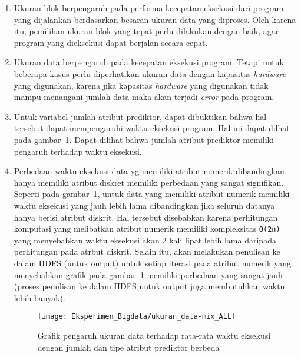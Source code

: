 \begin{enumerate}[label=(\alph*)]
	\item Ukuran blok berpengaruh pada performa kecepatan eksekusi dari program yang dijalankan berdasarkan besaran ukuran data yang diproses. Oleh karena itu, pemilihan ukuran blok yang tepat perlu dilakukan dengan baik, agar program yang dieksekusi dapat berjalan secara cepat.
	\item Ukuran data berpengaruh pada kecepatan eksekusi program. Tetapi untuk beberapa kasus perlu diperhatikan ukuran data dengan kapasitas \textit{hardware} yang digunakan, karena jika kapasitas \textit{hardware} yang digunakan tidak mampu menangani jumlah data maka akan terjadi \textit{error} pada program.
	\item Untuk variabel jumlah atribut prediktor, dapat dibuktikan bahwa hal tersebut dapat mempengaruhi waktu eksekusi program. Hal ini dapat dilhat pada gambar~\ref{fig:Grafik pengaruh ukuran data terhadap rata-rata waktu eksekusi mix}. Dapat dilihat bahwa jumlah atribut prediktor memiliki pengaruh terhadap waktu eksekusi.	
	\item Perbedaan waktu eksekusi data yg memiliki atribut numerik dibandingkan hanya memiliki atribut diskret memiliki perbedaan yang sangat signifikan. Seperti pada gambar~\ref{fig:Grafik pengaruh ukuran data terhadap rata-rata waktu eksekusi mix}, untuk data yang memiliki atribut numerik memiliki waktu eksekusi yang jauh lebih lama dibandingkan jika seluruh datanya hanya berisi atribut diskrit. Hal tersebut disebabkan karena perhitungan komputasi yang melibatkan atribut numerik memiliki kompleksitas \verb|O(2n)| yang menyebabkan waktu eksekusi akan 2 kali lipat lebih lama daripada perhitungan pada atrbut diskrit. Selain itu, akan melakukan penulisan ke dalam HDFS (untuk output) untuk setiap iterasi pada atribut numerik yang menyebabkan grafik pada gambar~\ref{fig:Grafik pengaruh ukuran data terhadap rata-rata waktu eksekusi mix} memiliki perbedaan yang sangat jauh (proses penulisan ke dalam HDFS untuk output juga membutuhkan waktu lebih banyak).
	\begin{figure}[H]
	\centering
	\texttt{[image: Eksperimen\_Bigdata/ukuran\_data-mix\_ALL]}
	\caption[Grafik pengaruh ukuran data terhadap rata-rata waktu eksekusi dengan jumlah dan tipe atribut prediktor berbeda]{Grafik pengaruh ukuran data terhadap rata-rata waktu eksekusi dengan jumlah dan tipe atribut prediktor berbeda}
	\label{fig:Grafik pengaruh ukuran data terhadap rata-rata waktu eksekusi mix}
	\end{figure}

\end{enumerate}
